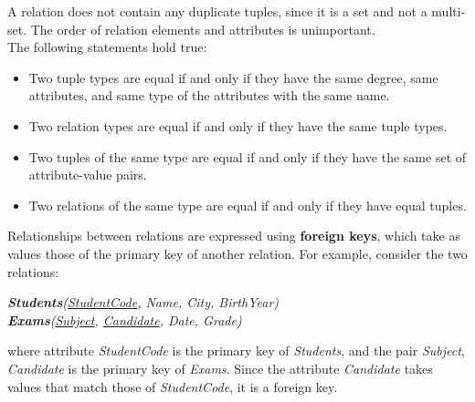 
A relation does not contain any duplicate tuples, since it is a set and not a multi-set. The order of relation elements and attributes is unimportant.\\
The following statements hold true:
\begin{itemize}[noitemsep]
    \item Two tuple types are equal if and only if they have the same degree, same attributes, and same type of the attributes with the same name.
    \item Two relation types are equal if and only if they have the same tuple types.
    \item Two tuples of the same type are equal if and only if they have the same set of attribute-value pairs. 
    \item Two relations of the same type are equal if and only if they have equal tuples.
\end{itemize}

Relationships between relations are expressed using \textbf{foreign keys}, which take as values those of the primary key of another relation. For example, consider the two relations:
\begin{center}
    \textit{\textbf{Students}(\underline{StudentCode}, Name, City, BirthYear)}\\
    \textit{\textbf{Exams}(\underline{Subject}, \underline{Candidate}, Date, Grade)}
\end{center}
where attribute \textit{StudentCode} is the primary key of \textit{Students}, and the pair \textit{Subject}, \textit{Candidate} is the primary key of \textit{Exams}. Since the attribute \textit{Candidate} takes values that match those of \textit{StudentCode}, it is a foreign key.

